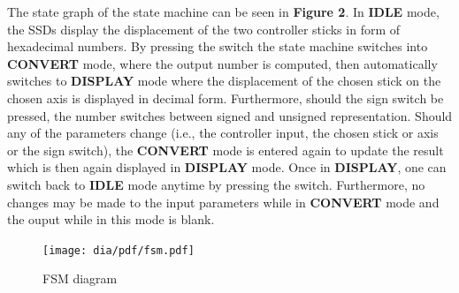 \documentclass[10pt,a4paper,titlepage,oneside]{article}
\begin{document}
\newpage

\begin{qa}{The state graph of the state machine can be seen in \textbf{Figure 2}. In \textbf{IDLE} mode, the SSDs display the displacement of the two controller
	   sticks in form of hexadecimal numbers. By pressing the switch the state machine switches into \textbf{CONVERT} mode, where the output number is computed, then automatically
	   switches to \textbf{DISPLAY} mode where the displacement of the chosen stick on the chosen axis is displayed in decimal form. Furthermore, should the sign switch be pressed, 
           the number switches between signed and unsigned representation. Should any of the parameters change (i.e., the controller input, the chosen stick or axis or the sign
           switch), the \textbf{CONVERT} mode is entered again to update the result which is then again displayed in \textbf{DISPLAY} mode. Once in \textbf{DISPLAY}, one can
	   switch back to \textbf{IDLE} mode anytime by pressing the switch. Furthermore, no changes may be made to the input parameters while in \textbf{CONVERT} mode and the ouput while
	   in this mode is blank.}

\begin{figure}[h!]
	\centering
	\texttt{[image: dia/pdf/fsm.pdf]}
	\caption{FSM diagram}
\end{figure}

\end{qa}


\end{document}
